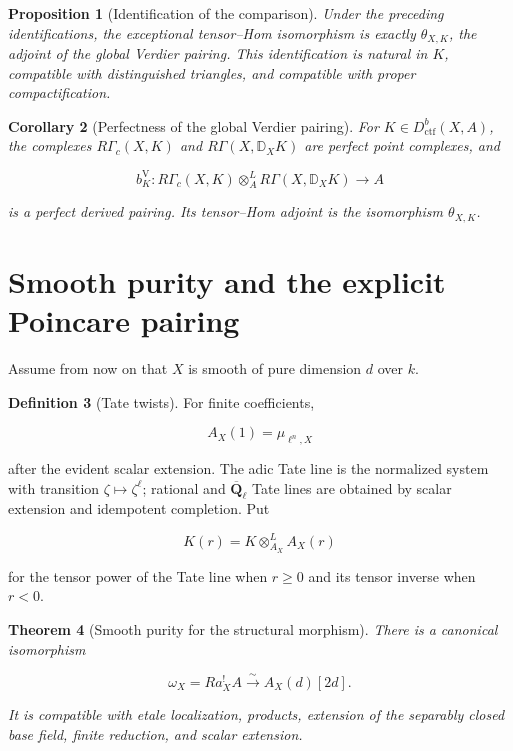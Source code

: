 \documentclass[10pt]{article}
\newtheorem{theorem}{Theorem}[section]
\newtheorem{proposition}[theorem]{Proposition}
\newtheorem{corollary}[theorem]{Corollary}
\theoremstyle{definition}
\newtheorem{definition}[theorem]{Definition}
\newcommand{\Qlb}{\overline{\mathbf Q}_\ell}
\newcommand{\Dctf}{D^b_{\mathrm{ctf}}}
\newcommand{\RG}{R\Gamma}
\newcommand{\RGc}{R\Gamma_c}
\newcommand{\DD}{\mathbb D}
\begin{document}
\begin{proposition}[Identification of the comparison]
Under the preceding identifications, the exceptional tensor--Hom
isomorphism is exactly \(\theta_{X,K}\), the adjoint of the global Verdier
pairing.  This identification is natural in \(K\), compatible with
distinguished triangles, and compatible with proper compactification.
\end{proposition}

\begin{corollary}[Perfectness of the global Verdier pairing]
For \(K\in\Dctf(X,A)\), the complexes \(\RGc(X,K)\) and
\(\RG(X,\DD_XK)\) are perfect point complexes, and

\[
 b^{\mathrm V}_K:
 \RGc(X,K)\otimes_A^L\RG(X,\DD_XK)\longrightarrow A
\]

is a perfect derived pairing.  Its tensor--Hom adjoint is the isomorphism
\(\theta_{X,K}\).
\end{corollary}

\section{Smooth purity and the explicit Poincare pairing}

Assume from now on that \(X\) is smooth of pure dimension \(d\) over \(k\).

\begin{definition}[Tate twists]
For finite coefficients,

\[
 A_X(1)=\mu_{\ell^n,X}
\]

after the evident scalar extension.  The adic Tate line is the normalized
system with transition \(\zeta\mapsto\zeta^\ell\); rational and \(\Qlb\)
Tate lines are obtained by scalar extension and idempotent completion.  Put

\[
 K(r)=K\otimes^L_{A_X}A_X(r)
\]

for the tensor power of the Tate line when \(r\geq0\) and its tensor inverse
when \(r<0\).
\end{definition}

\begin{theorem}[Smooth purity for the structural morphism]
There is a canonical isomorphism

\[
 \omega_X=Ra_X^!A\xrightarrow{\sim}A_X(d)[2d].
\]

It is compatible with etale localization, products, extension of the
separably closed base field, finite reduction, and scalar extension.
\end{theorem}
\end{document}
